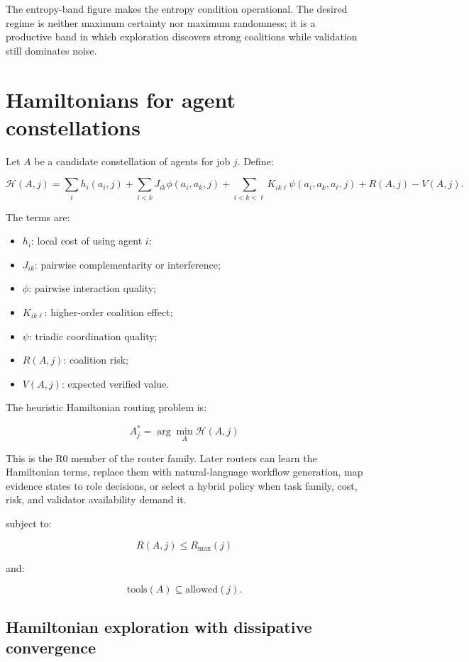 \documentclass[11pt]{article}
\providecommand{\tightlist}{\setlength{\itemsep}{0pt}\setlength{\parskip}{0pt}}
\begin{document}
The entropy-band figure makes the entropy condition operational. The desired regime is neither maximum certainty nor maximum randomness; it is a productive band in which exploration discovers strong coalitions while validation still dominates noise.

\section{Hamiltonians for agent constellations}\label{hamiltonians-for-agent-constellations}

Let \(A\) be a candidate constellation of agents for job \(j\). Define:

\[
\mathcal{H}(A,j)=
\sum_i h_i(a_i,j)
+
\sum_{i<k}J_{ik}\phi(a_i,a_k,j)
+
\sum_{i<k<\ell}K_{ik\ell}\psi(a_i,a_k,a_\ell,j)
+R(A,j)-V(A,j).
\]

The terms are:

\begin{itemize}
\tightlist
\item
  \(h_i\): local cost of using agent \(i\);
\item
  \(J_{ik}\): pairwise complementarity or interference;
\item
  \(\phi\): pairwise interaction quality;
\item
  \(K_{ik\ell}\): higher-order coalition effect;
\item
  \(\psi\): triadic coordination quality;
\item
  \(R(A,j)\): coalition risk;
\item
  \(V(A,j)\): expected verified value.
\end{itemize}

The heuristic Hamiltonian routing problem is:

\[
A^*_j=\arg\min_A\mathcal{H}(A,j)
\]

This is the R0 member of the router family. Later routers can learn the Hamiltonian terms, replace them with natural-language workflow generation, map evidence states to role decisions, or select a hybrid policy when task family, cost, risk, and validator availability demand it.

subject to:

\[
R(A,j)\leq R_{\max}(j)
\]

and:

\[
\text{tools}(A)\subseteq \text{allowed}(j).
\]

\subsection{Hamiltonian exploration with dissipative convergence}\label{hamiltonian-exploration-with-dissipative-convergence}
\end{document}
